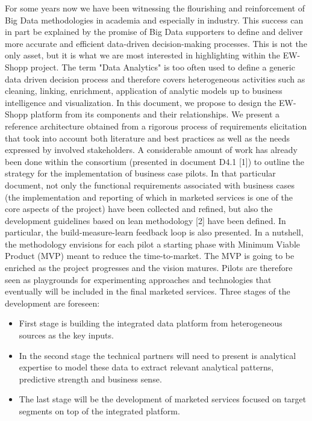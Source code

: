 For some years now we have been witnessing the flourishing and reinforcement of Big Data methodologies in academia and especially in industry. This success can in part be explained by the promise of Big Data supporters to define and deliver more accurate and efficient data-driven decision-making processes.
This is not the only asset, but it is what we are most interested in highlighting within the EW-Shopp project. 
The term "Data Analytics" is too often used to define a generic data driven decision process and therefore covers heterogeneous activities such as cleaning, linking, enrichment, application of analytic models up to business intelligence and visualization. In this document, we propose to design the EW-Shopp platform from its components and their relationships. We present a reference architecture obtained from a rigorous process of requirements elicitation that took into account both literature and best practices as well as the needs expressed by involved stakeholders. 
A considerable amount of work has already been done within the consortium (presented in document D4.1 [1]) to outline the strategy for the implementation of business case pilots. In that particular document, not only the functional requirements associated with business cases (the implementation and reporting of which in marketed services is one of the core aspects of the project) have been collected and refined, but also the development guidelines based on lean methodology [2] have been defined. In particular, the build-measure-learn feedback loop is also presented. In a nutshell, the methodology envisions for each pilot a starting phase with Minimum Viable Product (MVP) meant to reduce the time-to-market. The MVP is going to be enriched as the project progresses and the vision matures. Pilots are therefore seen as playgrounds for experimenting approaches and technologies that eventually will be included in the final marketed services. 
Three stages of the development are foreseen:
\begin{itemize}
    \item First stage is building the integrated data platform from heterogeneous sources as the key inputs. 
    \item In the second stage the technical partners will need to present is analytical expertise to model these data to extract relevant analytical patterns, predictive strength and business sense.
    \item The last stage will be the development of marketed services focused on target segments on top of the integrated platform.
\end{itemize}


